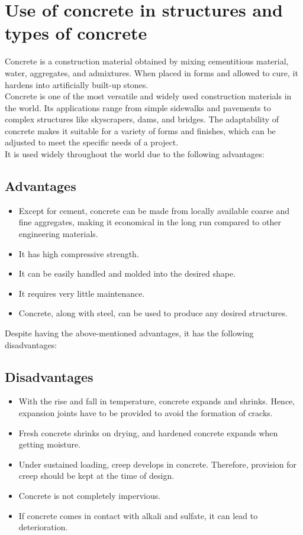 \documentclass[a4paper,11pt]{book}
\begin{document}
\section{Use of concrete in structures and types of concrete}
Concrete is a construction material obtained by mixing cementitious material, water, aggregates, and admixtures. When placed in forms and allowed to cure, it hardens into artificially built-up stones.\\
Concrete is one of the most versatile and widely used construction materials in the world. Its applications range from simple sidewalks and pavements to complex structures like skyscrapers, dams, and bridges. The adaptability of concrete makes it suitable for a variety of forms and finishes, which can be adjusted to meet the specific needs of a project.\\
It is used widely throughout the world due to the following advantages:
\subsection{Advantages}
\begin{itemize}
    \item Except for cement, concrete can be made from locally available coarse and fine aggregates, making it economical in the long run compared to other engineering materials.
    \item It has high compressive strength.
    \item It can be easily handled and molded into the desired shape.
    \item It requires very little maintenance.
    \item Concrete, along with steel, can be used to produce any desired structures.
    
\end{itemize}
Despite having the above-mentioned advantages, it has the following disadvantages:
\subsection{Disadvantages}
\begin{itemize}
\item With the rise and fall in temperature, concrete expands and shrinks. Hence, expansion joints have to be provided to avoid the formation of cracks.
\item Fresh concrete shrinks on drying, and hardened concrete expands when getting moisture.
\item Under sustained loading, creep develops in concrete. Therefore, provision for creep should be kept at the time of design.

\item Concrete is not completely impervious. 
\item If concrete comes in contact with alkali and sulfate, it can lead to deterioration.
\end{itemize}
\end{document}
